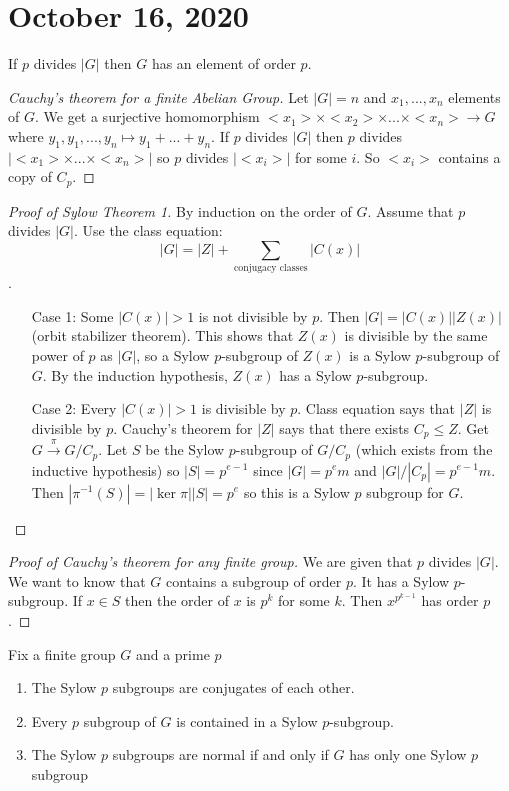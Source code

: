 \documentclass{article}
\newcommand{\ra}[1][]{\xrightarrow{#1}}
\begin{document}
\section{October 16, 2020}
\begin{theorem}
If $p$ divides $|G|$ then $G$ has an element of order $p$.
\end{theorem}
\begin{proof}[Cauchy's theorem for a finite Abelian Group]
Let $|G|=n$ and $x_1,...,x_n$ elements of $G$. We get a surjective homomorphism $<x_1>\times <x_2>\times...\times<x_n>\ra G$ where $y_1,y_1,...,y_n\mapsto y_1+...+y_n$. If $p$ divides $|G|$ then $p$ divides $|<x_1>\times...\times <x_n>|$ so $p$ divides $|<x_i>|$ for some $i$. So $<x_i>$ contains a copy of $C_p$.
\end{proof}
\begin{proof}[Proof of Sylow Theorem 1]
By induction on the order of $G$.
Assume that $p$ divides $|G|$. Use the class equation: $$|G|=|Z|+\sum_{\textrm{conjugacy classes}} |C(x)|$$.
\begin{enumerate}
    \item[Case 1:] Some $|C(x)|>1$ is not divisible by $p$. Then $|G|=|C(x)||Z(x)|$ (orbit stabilizer theorem). This shows that $Z(x)$ is divisible by the same power of $p$ as $|G|$, so a Sylow $p$-subgroup of $Z(x)$ is a Sylow $p$-subgroup of $G$. By the induction hypothesis, $Z(x)$ has a Sylow $p$-subgroup.
    \item[Case 2:] Every $|C(x)|>1$ is divisible by $p$. Class equation says that $|Z|$ is divisible by $p$. Cauchy's theorem for $|Z|$ says that there exists $C_p\leq Z$. Get $G\ra[\pi]G/C_p$. Let $S$ be the Sylow $p$-subgroup of $G/C_p$ (which exists from the inductive hypothesis) so $|S|=p^{e-1}$ since $|G|=p^em$ and $|G|/|C_p|=p^{e-1}m$. Then $|\pi^{-1}(S)|=|\ker\pi||S|=p^e$ so this is a Sylow $p$ subgroup for $G$.
\end{enumerate}
\end{proof}
\begin{proof}[Proof of Cauchy's theorem for any finite group]
We are given that $p$ divides $|G|$. We want to know that $G$ contains a subgroup of order $p$. It has a Sylow $p$-subgroup. If $x\in S$ then the order of $x$ is $p^k$ for some $k$. Then $x^{p^{k-1}}$ has order $p$.
\end{proof}
\begin{theorem}
Fix a finite group $G$ and a prime $p$
\begin{enumerate}
    \item The Sylow $p$ subgroups are conjugates of each other.
    \item Every $p$ subgroup of $G$ is contained in a Sylow $p$-subgroup.
    \item The Sylow $p$ subgroups are normal if and only if $G$ has only one Sylow $p$ subgroup
\end{enumerate}
\end{theorem}
\end{document}
